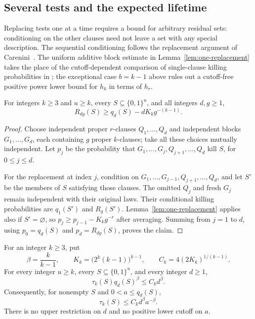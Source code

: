 \subsection{Several tests and the expected lifetime}

Replacing tests one at a time requires a bound for arbitrary residual
sets: conditioning on the other clauses need not leave a set with any
special description.  The sequential conditioning follows the replacement
argument of Carenini~\cite[Theorem~4.3]{Carenini}.  The uniform additive
block estimate in Lemma~\ref{lem:one-replacement} takes the place of the
cutoff-dependent comparison of single-clause killing probabilities in
\cite[Lemma~6.1]{Carenini}; the exceptional case \(b=k-1\) above
rules out a cutoff-free positive power lower bound for \(h_k\) in
terms of \(h_r\).

\begin{lemma}\label{lem:sequential-replacement}
For integers \(k\ge3\) and \(u\ge k\), every
\(S\subseteq\{0,1\}^u\), and all integers \(d,g\ge1\),
\begin{equation}\label{eq:sequential-replacement}
 R_{dg}(S)\ge q_d(S)-dK_k g^{-(k-1)}.
\end{equation}
\end{lemma}

\begin{proof}
Choose independent proper \(r\)-clauses \(Q_1,\ldots,Q_d\) and
independent blocks \(G_1,\ldots,G_d\), each containing \(g\) proper
\(k\)-clauses; take all these choices mutually independent.  Let
\(p_j\) be the probability that
\(G_1,\ldots,G_j,Q_{j+1},\ldots,Q_d\) kill \(S\), for \(0\le j\le d\).

For the replacement at index \(j\), condition on
\(G_1,\ldots,G_{j-1},Q_{j+1},\ldots,Q_d\), and let \(S'\) be the
members of \(S\) satisfying those clauses.  The omitted \(Q_j\) and
fresh \(G_j\) remain independent with their original laws.  Their
conditional killing probabilities are \(q_1(S')\) and \(R_g(S')\).
Lemma~\ref{lem:one-replacement} applies also if \(S'=\varnothing\),
so \(p_j\ge p_{j-1}-K_k g^{-r}\) after averaging.  Summing from
\(j=1\) to \(d\), using \(p_0=q_d(S)\) and \(p_d=R_{dg}(S)\), proves
the claim.
\end{proof}

\begin{proposition}
\label{prop:lifetime}
For an integer \(k\ge3\), put
\[
 \beta=\frac{k}{k-1},\qquad
 K_k=\bigl(2^k(k-1)\bigr)^{k-1},\qquad
 C_k=4(2K_k)^{1/(k-1)}.
\]
For every integer \(u\ge k\), every \(S\subseteq\{0,1\}^u\), and
every integer \(d\ge1\),
\begin{equation}\label{eq:lifetime-product}
 \tau_k(S)q_d(S)^\beta\le C_k d^\beta.
\end{equation}
Consequently, for nonempty \(S\) and \(0<a\le q_d(S)\),
\begin{equation}\label{eq:lifetime-level}
 \tau_k(S)\le C_k d^\beta a^{-\beta}.
\end{equation}
There is no upper restriction on \(d\) and no positive lower cutoff
on \(a\).
\end{proposition}

